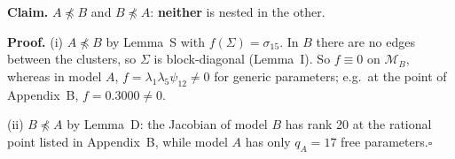 \documentclass[10pt,a4paper]{article}
\newcommand{\nnest}{\not\preceq}
\begin{document}
\par\bigskip
\noindent\textbf{Claim.} $A \nnest B$ and $B \nnest A$: \textbf{neither} is nested in the other.\par\smallskip
\noindent\textbf{Proof.} (i) $A\nnest B$ by Lemma~S with $f(\Sigma)=\sigma_{15}$. In $B$ there are no edges between the clusters, so $\Sigma$ is block-diagonal (Lemma~I). So $f\equiv0$ on $\mathcal M_B$, whereas in model $A$, $f=\lambda_1\lambda_5\psi_{12}\neq0$ for generic parameters; e.g.\ at the point of Appendix~B, $f=0.3000\neq0$.\par\smallskip
\noindent(ii) $B\nnest A$ by Lemma~D: the Jacobian of model $B$ has rank 20 at the rational point listed in Appendix~B, while model $A$ has only $q_A=17$ free parameters.\hfill$\square$\par\medskip
{}

\clearpage
\end{document}
